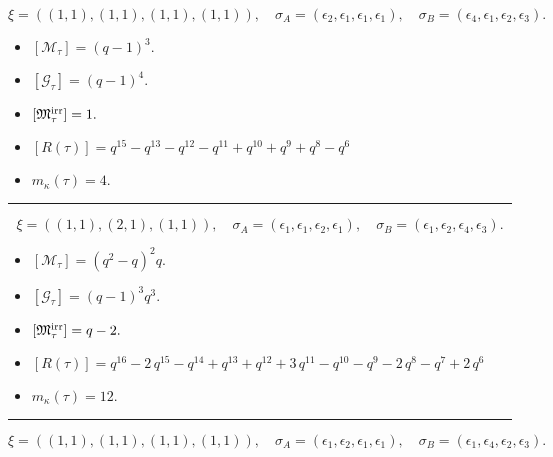 \documentclass[10pt,a4paper]{amsart}
\begin{document}
$$\xi = ({(1, 1)}, {(1, 1), (1, 1), (1, 1)}),\quad \sigma_A = ({{\epsilon_2}}, {{\epsilon_1}, {\epsilon_1}, {\epsilon_1}}),\quad \sigma_B = ({{\epsilon_4}}, {{\epsilon_1}, {\epsilon_2}, {\epsilon_3}}).$$

\begin{itemize}
 \item $[\mathcal{M}_{\tau}] = {\left(q - 1\right)}^{3} .$

 \item $[\mathcal{G}_{\tau}] = {\left(q - 1\right)}^{4} .$

 \item $[{\frak M}_{\tau}^{\textrm{irr}}] = 1 .$

 \item $[R(\tau)] = q^{15} - q^{13} - q^{12} - q^{11} + q^{10} + q^{9} + q^{8} - q^{6} $

 \item $m_{\kappa}(\tau) = 4 .$

 \end{itemize}
\noindent\rule{8cm}{0.4pt}

$$\xi = ({(1, 1)}, {(2, 1)}, {(1, 1)}),\quad \sigma_A = ({{\epsilon_1}}, {{\epsilon_1, \epsilon_2}}, {{\epsilon_1}}),\quad \sigma_B = ({{\epsilon_1}}, {{\epsilon_2, \epsilon_4}}, {{\epsilon_3}}).$$

\begin{itemize}
 \item $[\mathcal{M}_{\tau}] = {\left(q^{2} - q\right)}^{2} q .$

 \item $[\mathcal{G}_{\tau}] = {\left(q - 1\right)}^{3} q^{3} .$

 \item $[{\frak M}_{\tau}^{\textrm{irr}}] = q - 2 .$

 \item $[R(\tau)] = q^{16} - 2 \, q^{15} - q^{14} + q^{13} + q^{12} + 3 \, q^{11} - q^{10} - q^{9} - 2 \, q^{8} - q^{7} + 2 \, q^{6} $

 \item $m_{\kappa}(\tau) = 12 .$

 \end{itemize}
\noindent\rule{8cm}{0.4pt}

$$\xi = ({(1, 1)}, {(1, 1)}, {(1, 1), (1, 1)}),\quad \sigma_A = ({{\epsilon_1}}, {{\epsilon_2}}, {{\epsilon_1}, {\epsilon_1}}),\quad \sigma_B = ({{\epsilon_1}}, {{\epsilon_4}}, {{\epsilon_2}, {\epsilon_3}}).$$
\end{document}
